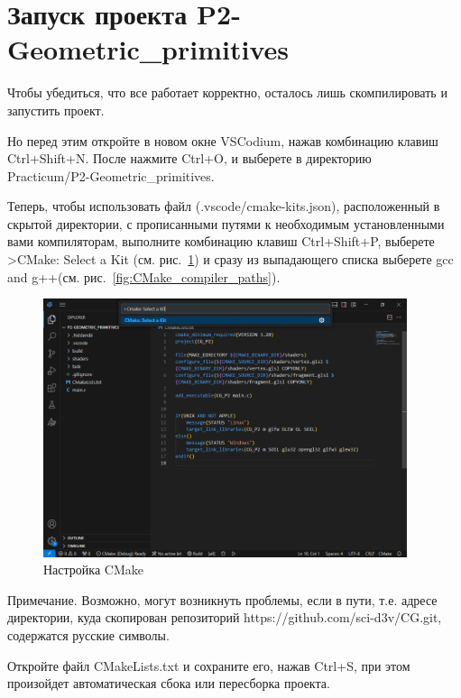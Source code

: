 \documentclass[a4paper,12pt]{article}
\begin{document}
\section{ Запуск проекта \textquotedbl P2-Geometric\_primitives\textquotedbl }

Чтобы убедиться, что все работает корректно, осталось лишь скомпилировать и запустить проект.

Но перед этим откройте в новом окне VSCodium, нажав комбинацию клавиш Ctrl+Shift+N. После нажмите Ctrl+O, и выберете в директорию \\ Practicum/P2-Geometric\_primitives.

Теперь, чтобы использовать файл (.vscode/cmake-kits.json), расположенный в скрытой директории, с прописанными путями к необходимым установленными вами компиляторам,
выполните комбинацию клавиш Ctrl+Shift+P, выберете
\textquotedbl >CMake: Select a Kit\textquotedbl
(см. рис.~\ref{fig:CMake_select_a_Kit}) и сразу из выпадающего списка выберете \textquotedbl gcc and g++\textquotedbl(см. рис.~\ref{fig:CMake_compiler_paths}).



\begin{figure}[H]
	\centering
	\includegraphics[width=0.95\textwidth]{images/CMake_select_a_Kit.png}
	\caption {Настройка CMake}
	\label{fig:CMake_select_a_Kit}
\end{figure}

Примечание.
Возможно, могут возникнуть проблемы, если в пути, т.е. адресе директории, куда скопирован репозиторий https://github.com/sci-d3v/CG.git, содержатся русские символы.

Откройте файл CMakeLists.txt и сохраните его, нажав Ctrl+S, при этом произойдет автоматическая сбока или пересборка проекта.
\end{document}

